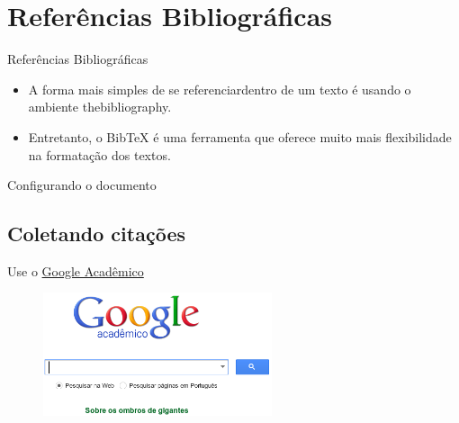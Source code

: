 \section{Referências Bibliográficas}

\begin{frame}{Referências Bibliográficas}
\begin{itemize}
 \item A forma mais simples de se referenciardentro de um texto é usando o ambiente {\ttfamily thebibliography}.
\item Entretanto, o Bib\TeX{} é uma ferramenta que oferece muito mais flexibilidade na formatação dos textos.
\end{itemize}
\end{frame}

\begin{frame}{Configurando o documento}

\end{frame}

\subsection{Coletando citações}

\begin{frame}{Use o \href{http://scholar.google.com.br}{Google Acadêmico}}
	
\begin{figure}[htbp!]
	\centering
	\includegraphics[width=0.6\textwidth]{figuras/google1.png}
	\caption{ }
\end{figure}
\end{frame}


